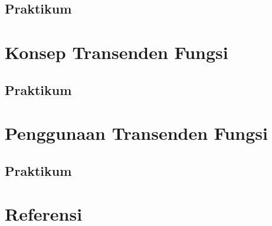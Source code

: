 \documentclass[
]{book}
\begin{document}
\section{Praktikum}\label{praktikum-6}

\chapter{Konsep Transenden Fungsi}\label{Konsep_Transenden_Fungsi}

\section{Praktikum}\label{praktikum-7}

\chapter{Penggunaan Transenden Fungsi}\label{Penggunaan_Transenden_Fungsi}

\section{Praktikum}\label{praktikum-8}

\chapter{Referensi}\label{referensi}

  
\end{document}
